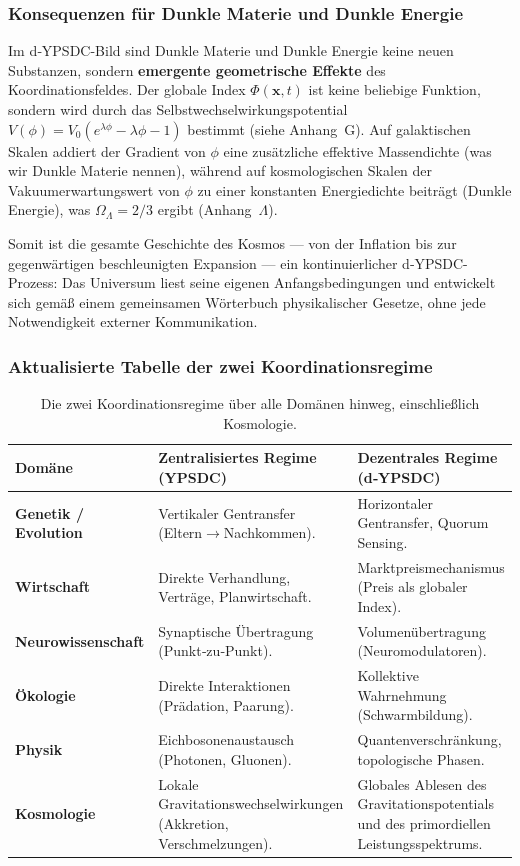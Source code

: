 \documentclass[11pt,a4paper]{article}
\begin{document}
	\subsubsection*{Konsequenzen für Dunkle Materie und Dunkle Energie}
	Im d‑YPSDC-Bild sind Dunkle Materie und Dunkle Energie keine neuen Substanzen, sondern \textbf{emergente geometrische Effekte} des Koordinationsfeldes. Der globale Index \(\Phi(\mathbf{x},t)\) ist keine beliebige Funktion, sondern wird durch das Selbstwechselwirkungspotential \(V(\phi) = V_0 (e^{\lambda \phi} - \lambda \phi - 1)\) bestimmt (siehe Anhang~G). Auf galaktischen Skalen addiert der Gradient von \(\phi\) eine zusätzliche effektive Massendichte (was wir Dunkle Materie nennen), während auf kosmologischen Skalen der Vakuumerwartungswert von \(\phi\) zu einer konstanten Energiedichte beiträgt (Dunkle Energie), was \(\Omega_\Lambda = 2/3\) ergibt (Anhang~\(\Lambda\)).
	
	Somit ist die gesamte Geschichte des Kosmos — von der Inflation bis zur gegenwärtigen beschleunigten Expansion — ein kontinuierlicher d‑YPSDC-Prozess: Das Universum liest seine eigenen Anfangsbedingungen und entwickelt sich gemäß einem gemeinsamen Wörterbuch physikalischer Gesetze, ohne jede Notwendigkeit externer Kommunikation.
	
	\subsubsection*{Aktualisierte Tabelle der zwei Koordinationsregime}
	\begin{table}[htbp]
		\centering
		\caption{Die zwei Koordinationsregime über alle Domänen hinweg, einschließlich Kosmologie.}
		\label{tab:two-regimes-full}
		\small
		\begin{tabular}{p{2.5cm}p{4.5cm}p{4.5cm}}
			\toprule
			\textbf{Domäne} & \textbf{Zentralisiertes Regime (YPSDC)} & \textbf{Dezentrales Regime (d‑YPSDC)} \\
			\midrule
			\textbf{Genetik / Evolution} &
			Vertikaler Gentransfer (Eltern$\to$Nachkommen). &
			Horizontaler Gentransfer, Quorum Sensing. \\
			\midrule
			\textbf{Wirtschaft} &
			Direkte Verhandlung, Verträge, Planwirtschaft. &
			Marktpreismechanismus (Preis als globaler Index). \\
			\midrule
			\textbf{Neurowissenschaft} &
			Synaptische Übertragung (Punkt‑zu‑Punkt). &
			Volumenübertragung (Neuromodulatoren). \\
			\midrule
			\textbf{Ökologie} &
			Direkte Interaktionen (Prädation, Paarung). &
			Kollektive Wahrnehmung (Schwarmbildung). \\
			\midrule
			\textbf{Physik} &
			Eichbosonenaustausch (Photonen, Gluonen). &
			Quantenverschränkung, topologische Phasen. \\
			\midrule
			\textbf{Kosmologie} &
			Lokale Gravitationswechselwirkungen (Akkretion, Verschmelzungen). &
			Globales Ablesen des Gravitationspotentials und des primordiellen Leistungsspektrums. \\
			\bottomrule
		\end{tabular}
	\end{table}
	
\end{document}
